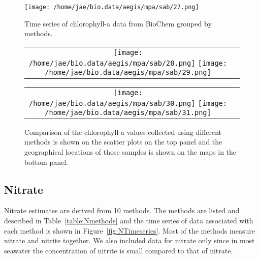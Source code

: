 \documentclass[letterpaper,portrait,11pt]{scrartcl}
\numberwithin{equation}{section}    %
\numberwithin{figure}{section}    %
\numberwithin{table}{section}       %
\begin{document}
\begin{appendices}
\begin{figure}[h]
  \label{fig:ChlaTimeseries}
  \centering
  \texttt{[image: /home/jae/bio.data/aegis/mpa/sab/27.png]}
  \caption{Time series of chlorophyll-a data from BioChem grouped by methods.}
\end{figure}


\begin{figure}[h]
  \centering
  \begin{tabular}{cc}
    \texttt{[image: /home/jae/bio.data/aegis/mpa/sab/28.png]}
    \texttt{[image: /home/jae/bio.data/aegis/mpa/sab/29.png]}
  \end{tabular}
  \begin{tabular}{cc}
    \texttt{[image: /home/jae/bio.data/aegis/mpa/sab/30.png]}
    \texttt{[image: /home/jae/bio.data/aegis/mpa/sab/31.png]}
  \end{tabular}
  \caption{Comparison of the chlorophyll-a values collected using different methods is shown on the scatter plots on the top panel and the geographical locations of those samples is shown on the maps in the bottom panel.}
  \label{fig:ChlaComparison}
\end{figure}


\subsection{Nitrate}

Nitrate estimates are derived from 10 methods. The methods are listed and described in Table~\ref{table:Nmethods} and the time series of data associated with each method is shown in Figure~\ref{fig:NTimeseries}. Most of the methods measure nitrate and nitrite together. We also included data for nitrate only since  in most seawater the concentration of nitrite is small compared to that of nitrate.


\end{appendices}
\end{document}
